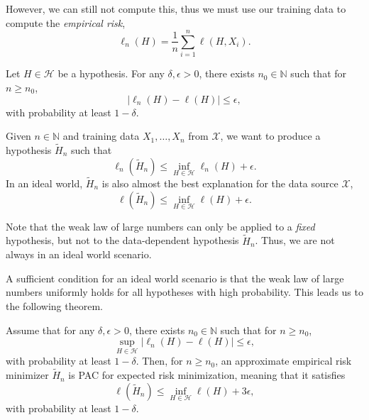 However, we can still not compute this, thus we must use our training data to compute the
\textit{empirical risk}, \[
    \ell_n(H) = \frac{1}{n} \sum_{i=1}^{n} \ell(H,X_i).
\]

\begin{lemma}
    Let $H \in \mathcal{H}$ be a hypothesis. For any $\delta,\epsilon > 0$, there exists
    $n_0\in \mathbb{N}$ such that for $n \geq n_0$, \[
        | \ell_n(H) - \ell(H) | \leq \epsilon,
    \]
    with probability at least $1-\delta$.
\end{lemma}

Given $n\in \mathbb{N}$ and training data $X_1,\ldots,X_n$ from $\mathcal{X}$, we want to produce a
hypothesis $\tilde{H}_n$ such that \[
    \ell_n(\tilde{H}_n) \leq \inf_{H \in \mathcal{H}} \ell_n(H) + \epsilon.
\]
In an ideal world, $\tilde{H}_n$ is also almost the best explanation for the data source
$\mathcal{X}$, \[
    \ell(\tilde{H}_n) \leq \inf_{H \in \mathcal{H}} \ell(H) + \epsilon.
\]

\begin{remark}
    Note that the weak law of large numbers can only be applied to a \textit{fixed} hypothesis, but
    not to the data-dependent hypothesis $\tilde{H}_n$. Thus, we are not always in an ideal world scenario.
\end{remark}

A sufficient condition for an ideal world scenario is that the weak law of large numbers uniformly
holds for all hypotheses with high probability. This leads us to the following theorem.

\begin{theorem}
    \label{thm:weaker-llm}

    Assume that for any $\delta,\epsilon > 0$, there exists $n_0 \in \mathbb{N}$ such that for $n \geq
        n_0$, \[
        \sup_{H\in \mathcal{H}} |\ell_n(H) - \ell(H)| \leq \epsilon,
    \]
    with probability at least $1-\delta$. Then, for $n \geq n_0$, an approximate empirical risk
    minimizer $\tilde{H}_n$ is PAC for expected risk minimization, meaning that it satisfies \[
        \ell(\tilde{H}_n) \leq \inf_{H\in \mathcal{H}} \ell(H) + 3\epsilon,
    \]
    with probability at least $1-\delta$.
\end{theorem}

